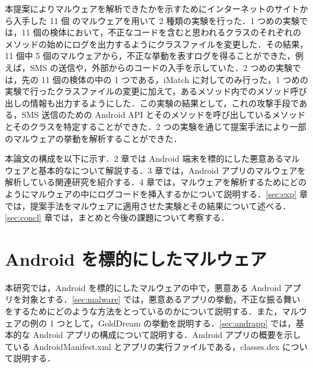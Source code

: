 \documentclass[12pt]{jsarticle}
\begin{document}
本提案によりマルウェアを解析できたかを示すためにインターネットのサイトから入手した 11 個 のマルウェアを用いて 2 種類の実験を行った．1 つめの実験では，11 個の検体において，不正なコードを含むと思われるクラスのそれぞれのメソッドの始めにログを出力するようにクラスファイルを変更した．その結果，11 個中 5 個のマルウェアから，不正な挙動を表すログを得ることができた，例えば，SMS の送信や，外部からのコードの入手を示していた．2 つめの実験では，先の 11 個の検体の中の 1 つである，iMatch に対してのみ行った，1 つめの実験で行ったクラスファイルの変更に加えて，あるメソッド内でのメソッド呼び出しの情報も出力するようにした．この実験の結果として，これの攻撃手段である，SMS 送信のための Android API とそのメソッドを呼び出しているメソッドとそのクラスを特定することができた．2 つの実験を通じて提案手法により一部のマルウェアの挙動を解析することができた．

本論文の構成を以下に示す．2 章では Android 端末を標的にした悪意あるマルウェアと基本的なについて解説する．3 章では，Android アプリのマルウェアを解析している関連研究を紹介する．4 章では，マルウェアを解析するためにどのようにマルウェアの中にログコードを挿入するかについて説明する．\ref{sec:exp} 章では，提案手法をマルウェアに適用させた実験とその結果について述べる．\ref{sec:concl} 章では，まとめと今後の課題について考察する．

\newpage

\section{Android  を標的にしたマルウェア}
本研究では，Android を標的にしたマルウェアの中で，悪意ある Android アプリを対象とする．\ref{sec:malware} では，悪意あるアプリの挙動，不正な振る舞いをするためにどのような方法をとっているのかについて説明する．また，マルウェアの例の 1 つとして，GoldDream の挙動を説明する．\ref{sec:andrapp} では，基本的な Android アプリの構成について説明する．Android アプリの概要を示している AndroidManifest.xml とアプリの実行ファイルである，classes.dex について説明する．
\end{document}

